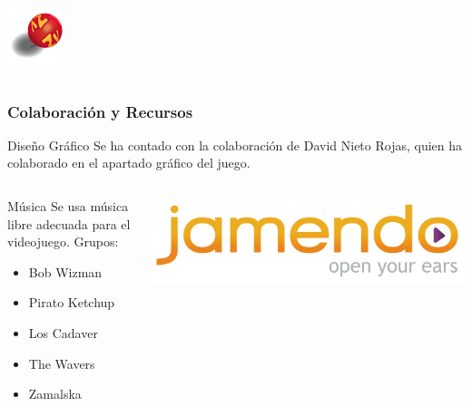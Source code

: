 \begin{frame}
\begin{columns}
        \begin{center}
                \includegraphics[scale=0.5]{imagenes/item_box.png}
        \end{center}
        
    \end{columns}

\end{frame}

\begin{frame}
    \frametitle{Colaboración y Recursos}

        \begin{block}{Diseño Gráfico}
        Se ha contado con la colaboración de David Nieto Rojas, quien ha colaborado en el apartado gráfico del juego.
        \end{block}
        
        \begin{columns}
        
            \column{150px}
            \begin{block}{Música}
            Se usa música libre adecuada para el videojuego. Grupos:
                \begin{itemize}
                    \item Bob Wizman
                    \item Pirato Ketchup
                    \item Los Cadaver
                    \item The Wavers
                    \item Zamalska 
                \end{itemize}
            \end{block}
            
            \column{150px}
            \begin{center}
                    \includegraphics[scale=0.05]{imagenes/logo_jamendo.png}
            \end{center}
            
        \end{columns}

\end{frame}

